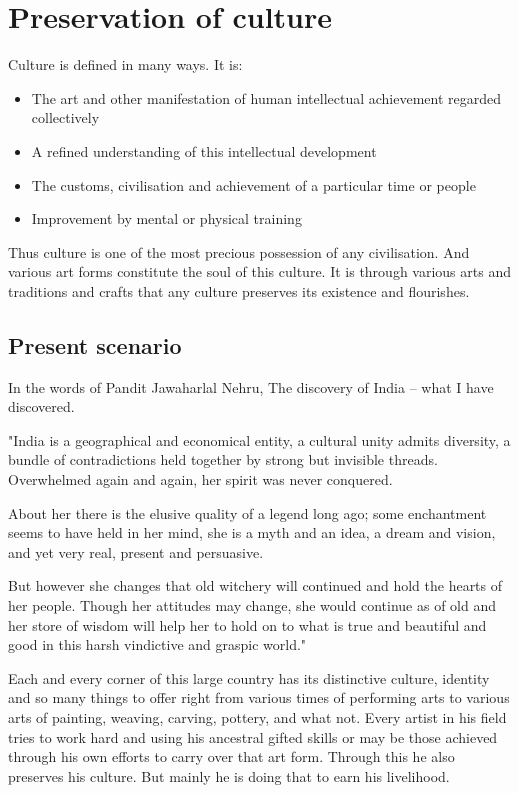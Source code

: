 \chapter{Preservation of culture} %
\label{cha:poc}

Culture is defined in many ways. It is:

\begin{itemize}
  \item The art and other manifestation of human intellectual achievement regarded collectively
  \item A refined understanding of this intellectual development
  \item The customs, civilisation and achievement of a particular time or people
  \item Improvement by mental or physical training
\end{itemize}

\noindent Thus culture is one of the most precious possession of any civilisation. And various art forms constitute the soul of this culture. It is through various arts and traditions and crafts that any culture preserves its existence and flourishes.

\section{Present scenario} %
\label{sec:ps}

In the words of Pandit Jawaharlal Nehru, The discovery of India -- what I have discovered. 

"India is a geographical and economical entity, a cultural unity admits diversity, a bundle of contradictions held together by strong but invisible threads. Overwhelmed again and again, her spirit was never conquered.

About her there is the elusive quality of a legend long ago; some enchantment seems to have held in her mind, she is a myth and an idea, a dream and vision, and yet very real, present and persuasive.

But however she changes that old witchery will continued and hold the hearts of her people. Though her attitudes may change, she would continue as of old and her store of wisdom will help her to hold on to what is true and beautiful and good in this harsh vindictive and graspic world."

Each and every corner of this large country has its distinctive culture, identity and so many things to offer right from various times of performing arts to various arts of painting, weaving, carving, pottery, and what not. Every artist in his field tries to work hard and using his ancestral gifted skills or may be those achieved through his own efforts to carry over that art form. Through this he also preserves his culture. But mainly he is doing that to earn his livelihood.

